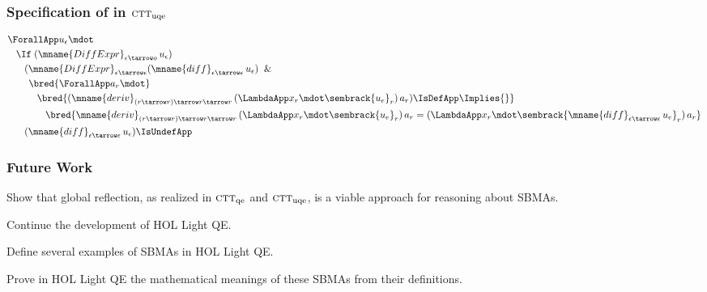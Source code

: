 \documentclass[t,12pt,numbers,fleqn]{beamer}
\newcommand{\churchqe}{$\mbox{\sc ctt}_{\rm qe}$}
\newcommand{\churchuqe}{$\mbox{\sc ctt}_{\rm uqe}$}
\begin{document}

\begin{frame}
\frametitle{Specification of  in \churchuqe}
\begin{align*}
&
\ForallApp u_\epsilon \mdot\\
& \hspace*{2ex}
\If \; (\mname{DiffExpr}_{\epsilon \tarrow o} \, u_\epsilon)\\
& \hspace*{4ex}
(\mname{DiffExpr}_{\epsilon \tarrow \epsilon}(\mname{diff}_{\epsilon \tarrow \epsilon} \, u_\epsilon) \And {}\\
& \hspace*{5ex}
\bred{\ForallApp a_r \mdot}\\
& \hspace*{7ex}
\bred{{(\mname{deriv}_{(r \tarrow r) \tarrow r \tarrow r}\,(\LambdaApp x_r \mdot \sembrack{u_e}_r)\,a_r)\IsDefApp} \Implies {}}\\
& \hspace*{9ex}
\bred{\mname{deriv}_{(r \tarrow r) \tarrow r \tarrow r}\,(\LambdaApp x_r \mdot \sembrack{u_e}_r)\,a_r =
(\LambdaApp x_r \mdot \sembrack{\mname{diff}_{\epsilon \tarrow \epsilon} \, u_e}_r)\,a_r}\\
& \hspace*{4ex}
(\mname{diff}_{\epsilon \tarrow \epsilon} \, u_\epsilon)\IsUndefApp
\end{align*}
\end{frame}


\begin{frame}
\frametitle{Future Work}
\bi

  \item Show that global reflection, as realized in {\churchqe} and
    {\churchuqe}, is a viable approach for reasoning about SBMAs.

  \item Continue the development of HOL Light QE.

  \item Define several examples of SBMAs in HOL Light QE.

  \item Prove in HOL Light QE the mathematical meanings of these SBMAs
    from their definitions.

\ei
\end{frame}
\end{document}
